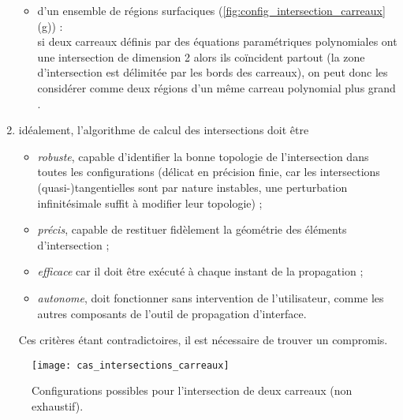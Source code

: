 \begin{enumerate}
\begin{itemize}
		\item d'un ensemble de régions surfaciques (\autoref{fig:config_intersection_carreaux}(g)) :\\
		si  deux carreaux définis par des équations paramétriques polynomiales ont une intersection de dimension 2 alors ils coïncident partout (la zone d'intersection est délimitée par les bords des carreaux), on peut donc les considérer comme deux régions d'un même carreau polynomial plus grand \cite[Théorème~3]{hu1997}.
	\end{itemize}

	\item idéalement, l'algorithme de calcul des intersections doit être
	\begin{itemize}
		\item \textit{robuste}, \ie capable d'identifier la bonne topologie de l'intersection dans toutes les configurations (délicat en précision finie, car les intersections (quasi-)tangentielles sont par nature instables, \ie une perturbation infinitésimale suffit à modifier leur topologie) ;
		\item \textit{précis}, \ie capable de restituer fidèlement la géométrie des éléments d'intersection ;
		\item \textit{efficace} car il doit être exécuté à chaque instant de la propagation ;
		\item \textit{autonome}, \ie doit fonctionner sans intervention de l'utilisateur, comme les autres composants de l'outil de propagation d'interface.
	\end{itemize}
	Ces critères étant contradictoires, il est nécessaire de trouver un compromis. 
	
\end{enumerate}

\begin{figure}
	\centering
	\texttt{[image: cas\_intersections\_carreaux]}
	\caption{Configurations possibles pour l'intersection de deux carreaux (non exhaustif).}
	\label{fig:config_intersection_carreaux}
\end{figure}



